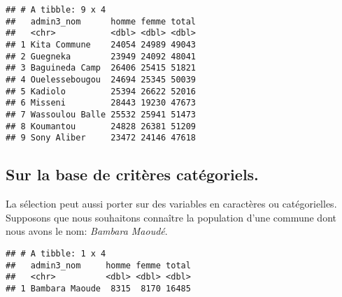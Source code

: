 \documentclass[]{book}
\newenvironment{Shaded}{\begin{snugshade}}{\end{snugshade}}
\newcommand{\KeywordTok}[1]{\textcolor[rgb]{0.13,0.29,0.53}{\textbf{#1}}}
\newcommand{\DecValTok}[1]{\textcolor[rgb]{0.00,0.00,0.81}{#1}}
\newcommand{\StringTok}[1]{\textcolor[rgb]{0.31,0.60,0.02}{#1}}
\newcommand{\CommentTok}[1]{\textcolor[rgb]{0.56,0.35,0.01}{\textit{#1}}}
\newcommand{\OperatorTok}[1]{\textcolor[rgb]{0.81,0.36,0.00}{\textbf{#1}}}
\newcommand{\NormalTok}[1]{#1}
\begin{document}
\begin{verbatim}
## # A tibble: 9 x 4
##   admin3_nom      homme femme total
##   <chr>           <dbl> <dbl> <dbl>
## 1 Kita Commune    24054 24989 49043
## 2 Guegneka        23949 24092 48041
## 3 Baguineda Camp  26406 25415 51821
## 4 Ouelessebougou  24694 25345 50039
## 5 Kadiolo         25394 26622 52016
## 6 Misseni         28443 19230 47673
## 7 Wassoulou Balle 25532 25941 51473
## 8 Koumantou       24828 26381 51209
## 9 Sony Aliber     23472 24146 47618
\end{verbatim}

\subsection{Sur la base de critères
catégoriels.}\label{sur-la-base-de-criteres-categoriels.}

La sélection peut aussi porter sur des variables en caractères ou
catégorielles. Supposons que nous souhaitons connaître la population
d'une commune dont nous avons le nom: \emph{Bambara Maoudé}.

\begin{Shaded}
\end{Shaded}

\begin{verbatim}
## # A tibble: 1 x 4
##   admin3_nom     homme femme total
##   <chr>          <dbl> <dbl> <dbl>
## 1 Bambara Maoude  8315  8170 16485
\end{verbatim}
\end{document}
